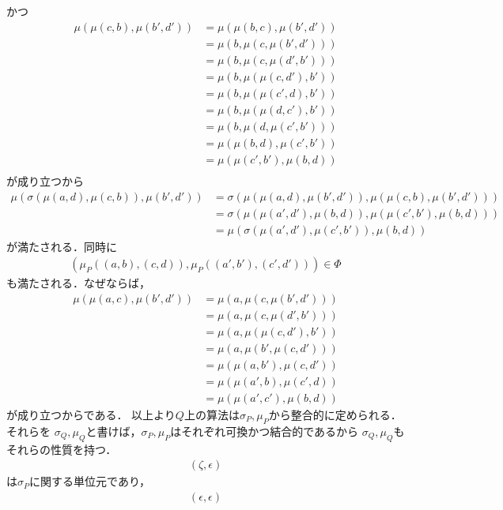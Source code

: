 	かつ
	\begin{align}
		\mu(\mu(c,b),\mu(b',d')) &= \mu(\mu(b,c),\mu(b',d')) \\
		&= \mu(b,\mu(c,\mu(b',d'))) \\
		&= \mu(b,\mu(c,\mu(d',b'))) \\
		&= \mu(b,\mu(\mu(c,d'),b')) \\
		&= \mu(b,\mu(\mu(c',d),b')) \\
		&= \mu(b,\mu(\mu(d,c'),b')) \\
		&= \mu(b,\mu(d,\mu(c',b'))) \\
		&= \mu(\mu(b,d),\mu(c',b')) \\
		&= \mu(\mu(c',b'),\mu(b,d)) \\
	\end{align}
	が成り立つから
	\begin{align}
		\mu\left(\sigma(\mu(a,d),\mu(c,b)),\mu(b',d')\right)
		&= \sigma\left(\mu(\mu(a,d),\mu(b',d')),\mu(\mu(c,b),\mu(b',d'))\right) \\
		&= \sigma\left(\mu(\mu(a',d'),\mu(b,d)),\mu(\mu(c',b'),\mu(b,d))\right) \\
		&= \mu\left(\sigma(\mu(a',d'),\mu(c',b')),\mu(b,d)\right)
	\end{align}
	が満たされる．同時に
	\begin{align}
		\left(\mu_P((a,b),(c,d)),\mu_P((a',b'),(c',d'))\right) \in \Phi
	\end{align}
	も満たされる．なぜならば，
	\begin{align}
		\mu(\mu(a,c),\mu(b',d')) &= \mu(a,\mu(c,\mu(b',d'))) \\
		&= \mu(a,\mu(c,\mu(d',b'))) \\
		&= \mu(a,\mu(\mu(c,d'),b')) \\
		&= \mu(a,\mu(b',\mu(c,d'))) \\
		&= \mu(\mu(a,b'),\mu(c,d')) \\
		&= \mu(\mu(a',b),\mu(c',d)) \\
		&= \mu(\mu(a',c'),\mu(b,d))
	\end{align}
	が成り立つからである．
	以上より$Q$上の算法は$\sigma_P,\mu_P$から整合的に定められる．それらを
	$\sigma_Q,\mu_Q$と書けば，$\sigma_P,\mu_P$はそれぞれ可換かつ結合的であるから
	$\sigma_Q,\mu_Q$もそれらの性質を持つ．
	\begin{align}
		(\zeta,\epsilon)
	\end{align}
	は$\sigma_P$に関する単位元であり，
	\begin{align}
		(\epsilon,\epsilon)
	\end{align}
